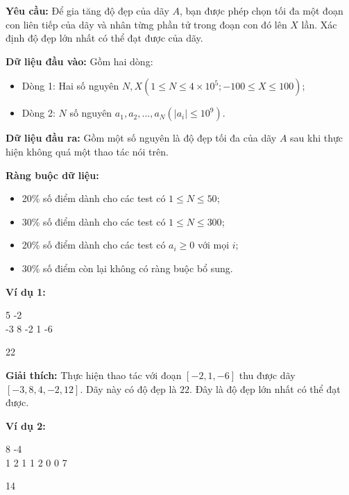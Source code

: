\documentclass[12pt]{scrartcl}  %
\begin{document}
\textbf{Yêu cầu:}
Để gia tăng độ đẹp của dãy $A$, bạn được phép chọn tối đa một đoạn con liên tiếp của dãy và nhân từng phần tử trong đoạn con đó lên 
$X$ lần. Xác định độ đẹp lớn nhất có thể đạt được của dãy.

\textbf{Dữ liệu đầu vào:}
Gồm hai dòng:
\begin{itemize}
    \item Dòng 1: Hai số nguyên $N, X (1 \leq N \leq 4 \times 10^5; -100 \leq X \leq 100)$;
    \item Dòng 2: $N$ số nguyên $a_1, a_2, ..., a_N (|a_i| \leq 10^9)$.
\end{itemize}

\textbf{Dữ liệu đầu ra:}
Gồm một số nguyên là độ đẹp tối đa của dãy $A$ sau khi thực hiện không quá một thao tác nói trên.

\textbf{Ràng buộc dữ liệu:}
\begin{itemize}
    \item 20\% số điểm dành cho các test có $1 \leq N \leq 50$;
    \item 30\% số điểm dành cho các test có $1 \leq N \leq 300$;
    \item 20\% số điểm dành cho các test có $a_i \geq 0$ với mọi $i$;
    \item 30\% số điểm còn lại không có ràng buộc bổ sung.
\end{itemize}

\textbf{Ví dụ 1:}
\begin{tcolorbox}[colback=gray!5!white, colframe=blue!50!black, title=Input]
5 -2\\
-3 8 -2 1 -6
\end{tcolorbox}
\begin{tcolorbox}[colback=gray!5!white, colframe=green!50!black, title=Output]
22
\end{tcolorbox}

\textbf{Giải thích:}
Thực hiện thao tác với đoạn $\left[ -2, 1, -6 \right]$ thu được dãy $\left[ -3, 8, 4, -2, 12 \right]$. Dãy này có độ đẹp là $22$. Đây là độ đẹp lớn nhất có thể đạt được.

\textbf{Ví dụ 2:}
\begin{tcolorbox}[colback=gray!5!white, colframe=blue!50!black, title=Input]
8 -4\\
1 2 1 1 2 0 0 7
\end{tcolorbox}
\begin{tcolorbox}[colback=gray!5!white, colframe=green!50!black, title=Output]
14
\end{tcolorbox}
\end{document}
